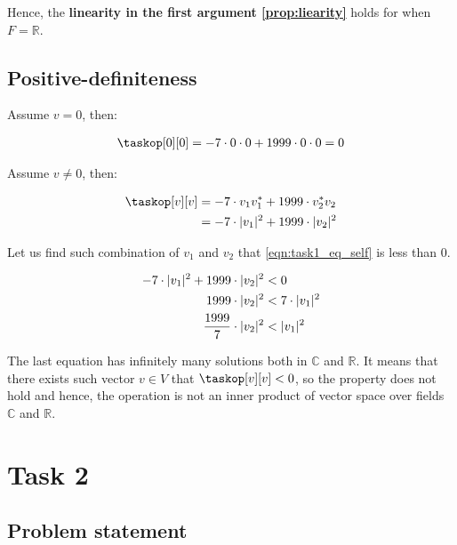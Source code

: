 \documentclass[a4paper]{article}
\theoremstyle{break}
\theoremstyle{break}
\DeclarePairedDelimiter\abs{\lvert}{\rvert}
\begin{document}
Hence, the \textbf{linearity in the first argument \ref{prop:liearity}} holds for \taskop when $F = \mathbb{R}$.

\subsection{Positive-definiteness}

Assume $v = 0$, then:

\begin{equation*}
  \begin{split}
    \taskop[0][0] = -7 \cdot 0 \cdot 0 + 1999 \cdot 0 \cdot 0 = 0
  \end{split}
\end{equation*}

Assume $v \neq 0$, then:

\begin{equation} \label{eqn:task1_eq_self}
  \begin{split}
    \taskop[v][v]
      &= -7 \cdot v_1v_1^* + 1999 \cdot v_2^*v_2 \\
      &= -7 \cdot \abs{v_1}^2 + 1999 \cdot \abs{v_2}^2
  \end{split}
\end{equation}

Let us find such combination of $v_1$ and $v_2$ that \eqref{eqn:task1_eq_self} is less than 0.

\begin{equation*}
  \begin{split}
    -7 \cdot \abs{v_1}^2 + 1999 \cdot \abs{v_2}^2 &< 0 \\
    1999 \cdot \abs{v_2}^2 &< 7 \cdot \abs{v_1}^2 \\
    \frac{1999}{7} \cdot \abs{v_2}^2 &< \abs{v_1}^2
  \end{split}
\end{equation*}

The last equation has infinitely many solutions both in $\mathbb{C}$ and $\mathbb{R}$. It means that there exists such vector $v \in V$ that $\taskop[v][v] < 0$, so the property does not hold and hence, the operation \taskop is not an inner product of vector space over fields $\mathbb{C}$ and $\mathbb{R}$.

\section{Task 2}

\subsection*{Problem statement}
\end{document}
